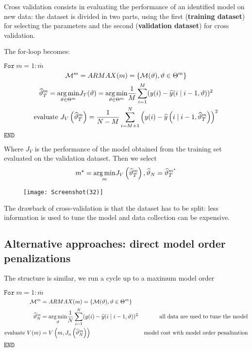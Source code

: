 Cross validation consists in evaluating the performance of an identified model on new data: the dataset is divided in two parts, using the first (\textbf{training dataset}) for selecting the parameters and the second (\textbf{validation dataset}) for cross validation.

The for-loop becomes:

$ \mathtt{For } \ m=1:\overline{m}$
\begin{gather*}
\mathcal{M}^{m} =ARMAX(m) =\left\{\mathcal{M}(\vartheta) ,\vartheta \in \Theta ^{m}\right\}\\
\widehat{\vartheta }_{T}^{m} =\underset{\vartheta \in \Theta ^{m}}{\operatorname*{arg\,min}} J_{T}(\vartheta) =\underset{\vartheta \in \Theta ^{m}}{\operatorname*{arg\,min}}\frac{1}{M}\sum _{i=1}^{M}(y(i) -\widehat{y}(i\mid i-1,\vartheta))^{2}\\
\text{evaluate } J_{V}\left(\widehat{\vartheta }_{T}^{m}\right) =\frac{1}{N-M}\sum _{i=M+1}^{N}\left(y(i) -\widehat{y}\left(i\mid i-1,\widehat{\vartheta }_{T}^{m}\right)\right)^{2}
\end{gather*}
$ \mathtt{END}$

Where $ J_{V}$ is the performance of the model obtained from the training set evaluated on the validation dataset. Then we select
\begin{equation*}
m^{\star} =\underset{m}{\operatorname*{arg\,min}} J_{V}\left(\widehat{\vartheta }_{T}^{m}\right) ,\widehat{\vartheta }_{N} =\widehat{\vartheta }_{T}^{m^{\star}}
\end{equation*}

\begin{figure}[htpb]
    \centering
    \texttt{[image: Screenshot(32)]}
\end{figure}
\FloatBarrier
The drawback of cross-validation is that the dataset has to be split: less information is used to tune the model and data collection can be expensive.


\subsection{Alternative approaches: direct model order penalizations}
The structure is similar, we run a cycle up to a maximum model order

$ \mathtt{For } \ m=1:\overline{m}$
\begin{equation*}
\begin{aligned}
\mathcal{M}^{m} & =ARMAX(m) =\left\{\mathcal{M}(\vartheta) ,\vartheta \in \Theta ^{m}\right\} & \\
\widehat{\vartheta }_{N}^{m}  & =\underset{\vartheta }{\operatorname*{arg\,min}}\frac{1}{N}\sum _{i=1}^{N}(y(i) -\widehat{y}(i\mid i-1,\vartheta))^{2} & \text{all data are used to tune the model}\\
\text{evaluate } V(m) & =V\left(m,J_{n}\left(\widehat{\vartheta }_{N}^{m}\right)\right) & \text{model cost with model order penalization}
\end{aligned}
\end{equation*}
$ \mathtt{END}$

